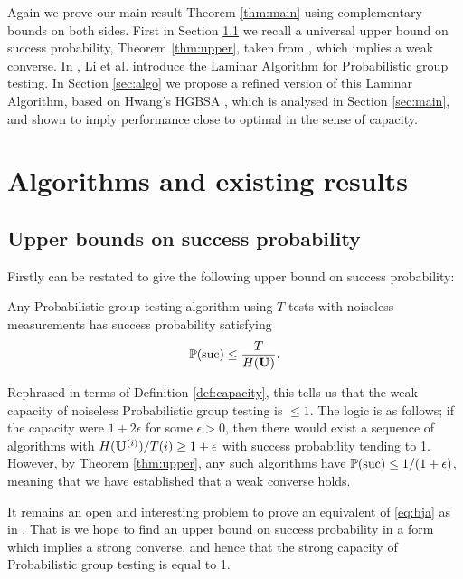 Again we prove our main result Theorem \ref{thm:main} using complementary bounds on both sides. First in Section \ref{sec:ub} we recall
 a universal upper bound on success probability, Theorem \ref{thm:upper}, taken from
\cite{li5}, which implies a weak converse.   In \cite{li5}, Li et al. introduce
the Laminar Algorithm for Probabilistic group testing.  
In Section \ref{sec:algo} we propose a refined version of this Laminar Algorithm, based on Hwang's HGBSA \cite{hwang}, which is
analysed in Section \ref{sec:main}, and shown to imply performance close to optimal in the sense of capacity.

\section{Algorithms and existing results}

\subsection{Upper bounds on success probability} \label{sec:ub}

Firstly \cite[Theorem 1]{li5} can be restated to give the following
upper bound on success probability:
%
\begin{theorem} \label{thm:upper}
Any Probabilistic group testing algorithm using $T$ tests with noiseless measurements has success probability satisfying
$$ {\mathbb{P}}({\rm suc}) \leq \frac{T}{H( {\mathbf{ U}})}.$$
\end{theorem}

Rephrased in terms of Definition \ref{def:capacity}, this tells us that the weak capacity of noiseless Probabilistic 
group testing is $\leq 1$. The logic is as follows; if the capacity were
$1 + 2 \epsilon$ for some $\epsilon > 0$, then there would exist a sequence of algorithms with $H({\mathbf{ U}}^{(i)})/T(i) \geq 1 + \epsilon$ with success probability tending to 1.
However, by Theorem \ref{thm:upper}, any such algorithms have ${\mathbb{P}}({\rm suc}) \leq 1/(1+\epsilon)$, meaning that we have 
established that a weak converse holds.

\begin{remark}
It remains an open and interesting problem to prove an equivalent of \eqref{eq:bja} as in \cite[Theorem 3.1]{johnsonc10}. That is we hope to find an upper bound
on success probability in a form  which implies a strong converse, and hence that the strong capacity of Probabilistic group
testing is equal to 1.
\end{remark}

